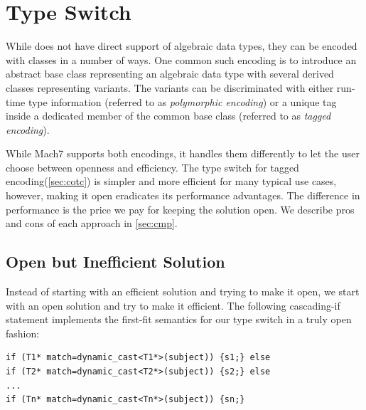 \section{Type Switch}
\label{sec:copc}

While \Cpp{} does not have direct support of algebraic data types, they can be 
encoded with classes in a number of ways. One common such encoding is to 
introduce an abstract base class representing an algebraic data type with 
several derived classes representing variants. The variants can be 
discriminated with either run-time type information (referred to as 
\emph{polymorphic encoding}) or a unique tag inside a dedicated member of the 
common base class (referred to  as \emph{tagged encoding}).

While Mach7 supports both encodings, it handles them differently to let 
the user choose between openness and efficiency. The type switch for tagged 
encoding(\textsection\ref{sec:cotc}) is simpler and more efficient for many typical use cases, however, 
making it open eradicates its performance advantages. The difference in 
performance is the price we pay for keeping the solution open. We describe pros 
and cons of each approach in \textsection\ref{sec:cmp}.




\subsection{Open but Inefficient Solution}
\label{sec:poets}

Instead of starting with an efficient solution and trying to make it open, we 
start with an open solution and try to make it efficient. The following 
cascading-if statement implements the first-fit semantics for our type switch in 
a truly open fashion:

\begin{lstlisting}
if (T1* match=dynamic_cast<T1*>(subject)) {s1;} else
if (T2* match=dynamic_cast<T2*>(subject)) {s2;} else
...
if (Tn* match=dynamic_cast<Tn*>(subject)) {sn;}
\end{lstlisting}

